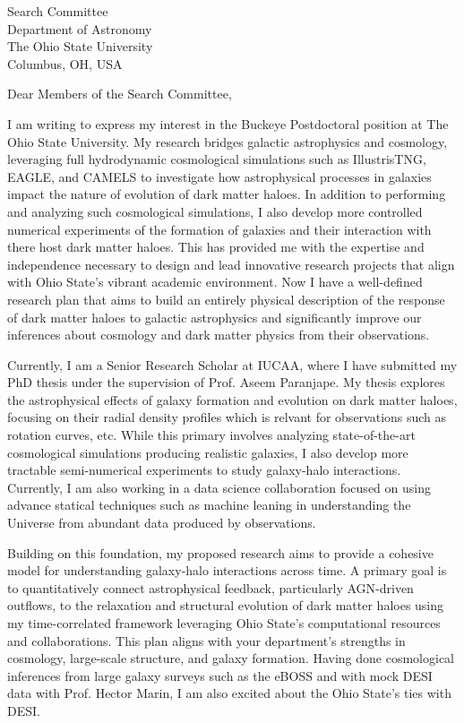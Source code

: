 \documentclass[11pt]{letter}
\begin{document}
\begin{letter}{Search Committee \\ Department of Astronomy \\ The Ohio State University \\ Columbus, OH, USA}

\opening{Dear Members of the Search Committee,}

I am writing to express my interest in the Buckeye Postdoctoral position at The Ohio State University. My research bridges galactic astrophysics and cosmology, leveraging full hydrodynamic cosmological simulations such as IllustrisTNG, EAGLE, and CAMELS to investigate how astrophysical processes in galaxies impact the nature of evolution of dark matter haloes. In addition to performing and analyzing such cosmological simulations, I also develop more controlled numerical experiments of the formation of galaxies and their interaction with there host dark matter haloes. This has provided me with the expertise and independence necessary to design and lead innovative research projects that align with Ohio State's vibrant academic environment. Now I have a well-defined research plan that aims to build an entirely physical description of the response of dark matter haloes to galactic astrophysics and significantly improve our inferences about cosmology and dark matter physics from their observations.

Currently, I am a Senior Research Scholar at IUCAA, where I have submitted my PhD thesis under the supervision of Prof. Aseem Paranjape. My thesis explores the astrophysical effects of galaxy formation and evolution on dark matter haloes, focusing on their radial density profiles which is relvant for observations such as rotation curves, etc. While this primary involves analyzing state-of-the-art cosmological simulations producing realistic galaxies, I also develop more tractable semi-numerical experiments to study galaxy-halo interactions. Currently, I am also working in a data science collaboration focused on using advance statical techniques such as machine leaning in understanding the Universe from abundant data produced by observations. 

Building on this foundation, my proposed research aims to provide a cohesive model for understanding galaxy-halo interactions across time. A primary goal is to quantitatively connect astrophysical feedback, particularly AGN-driven outflows, to the relaxation and structural evolution of dark matter haloes using my time-correlated framework leveraging Ohio State's computational resources and collaborations. This plan aligns with your department's strengths in cosmology, large-scale structure, and galaxy formation. Having done cosmological inferences from large galaxy surveys such as the eBOSS and with mock DESI data with Prof. Hector Marin, I am also excited about the Ohio State's ties with DESI.


\end{letter}
\end{document}
